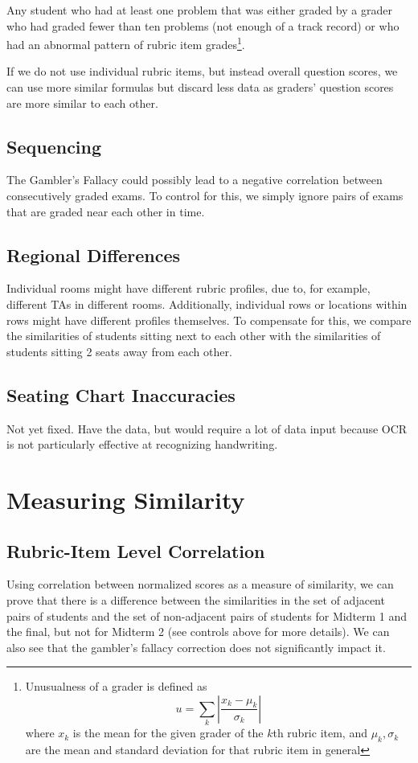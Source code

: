 \documentclass{article}
\begin{document}
        Any student who had at least one problem that was either graded by a grader who had graded fewer
            than ten problems (not enough of a track record) or who had an abnormal pattern of rubric item
            grades\footnote{Unusualness of a grader is defined as
                $$u = \sum_k \left|\frac{x_k - \mu_k}{\sigma_k}\right|$$ where $x_k$ is the mean for the
                given grader of the $k$th rubric item, and $\mu_k, \sigma_k$ are the mean and standard
                deviation for that rubric item in general}.

        If we do not use individual rubric items, but instead overall question scores, we can use
            more similar formulas but discard less data as graders' question scores are more similar
            to each other.
    \subsection{Sequencing}
        The Gambler's Fallacy could possibly lead to a negative correlation between consecutively graded
            exams. To control for this, we simply ignore pairs of exams that are graded near each other in
            time.
    \subsection{Regional Differences}
        Individual rooms might have different rubric profiles, due to, for example, different TAs in
            different rooms. Additionally, individual rows or locations within rows might have
            different profiles themselves. To compensate for this, we compare the similarities of
            students sitting next to each other with the similarities of students sitting 2 seats
            away from each other.
    \subsection{Seating Chart Inaccuracies}
        Not yet fixed. Have the data, but would require a lot of data input because OCR is not particularly
            effective at recognizing handwriting.
\section{Measuring Similarity}
    \subsection{Rubric-Item Level Correlation}
        Using correlation between normalized scores as a measure of similarity, we can prove that
            there is a difference between the similarities in the set of adjacent pairs of students
            and the set of non-adjacent pairs of students for Midterm 1 and the final, but not for
            Midterm 2 (see controls above for more details). We can also see that the gambler's
            fallacy correction does not significantly impact it.
\end{document}
